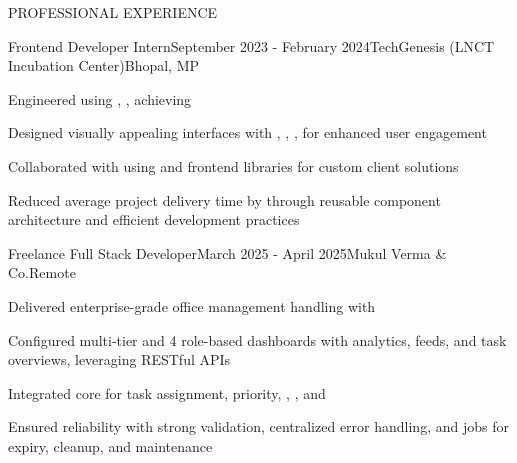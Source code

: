 \documentclass{resume}
\begin{document}
\begin{rSection}{PROFESSIONAL EXPERIENCE}

\begin{rExperience}{Frontend Developer Intern}{September 2023 - February 2024}{TechGenesis (LNCT Incubation Center)}{Bhopal, MP}
\item Engineered  using , ,  achieving 
\item Designed visually appealing interfaces with , , ,  for enhanced user engagement
\item Collaborated with  using  and frontend libraries for custom client solutions
\item Reduced average project delivery time by  through reusable component architecture and efficient development practices
\end{rExperience}

\begin{rExperience}{Freelance Full Stack Developer}{March 2025 - April 2025}{Mukul Verma \& Co.}{Remote}
\item Delivered enterprise-grade office management  handling  with 
\item Configured multi-tier  and 4 role-based dashboards with analytics, feeds, and task overviews, leveraging RESTful APIs
\item Integrated core  for task assignment, priority, , , and 
\item Ensured reliability with strong validation, centralized error handling, and  jobs for expiry, cleanup, and maintenance
\end{rExperience}

\end{rSection}
\end{document}
